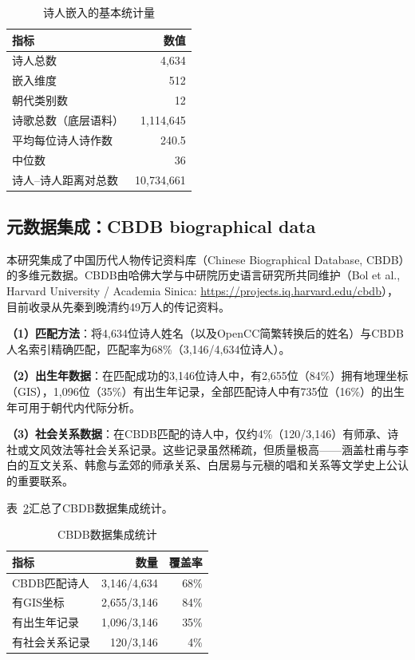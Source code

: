 \documentclass[12pt,a4paper]{article}
\numberwithin{equation}{section}
\begin{document}
\begin{table}[htbp]
  \centering
  \caption{诗人嵌入的基本统计量}
  \label{tab:embedding-stats}
  \begin{tabular}{lr}
    \toprule
    指标 & 数值 \\
    \midrule
    诗人总数               & 4,634      \\
    嵌入维度               & 512        \\
    朝代类别数             & 12         \\
    诗歌总数（底层语料）   & 1,114,645  \\
    平均每位诗人诗作数     & 240.5      \\
    中位数                 & 36         \\
    诗人--诗人距离对总数   & 10,734,661 \\
    \bottomrule
  \end{tabular}
\end{table}

\subsection{元数据集成：CBDB biographical data}

本研究集成了中国历代人物传记资料库（Chinese Biographical Database, CBDB）的多维元数据。CBDB由哈佛大学与中研院历史语言研究所共同维护（Bol et al., Harvard University / Academia Sinica: \url{https://projects.iq.harvard.edu/cbdb}），目前收录从先秦到晚清约49万人的传记资料。

\textbf{（1）匹配方法}：将4,634位诗人姓名（以及OpenCC简繁转换后的姓名）与CBDB人名索引精确匹配，匹配率为68\%（3,146/4,634位诗人）。

\textbf{（2）出生年数据}：在匹配成功的3,146位诗人中，有2,655位（84\%）拥有地理坐标（GIS），1,096位（35\%）有出生年记录，全部匹配诗人中有735位（16\%）的出生年可用于朝代内代际分析。

\textbf{（3）社会关系数据}：在CBDB匹配的诗人中，仅约4\%（120/3,146）有师承、诗社或文风效法等社会关系记录。这些记录虽然稀疏，但质量极高——涵盖杜甫与李白的互文关系、韩愈与孟郊的师承关系、白居易与元稹的唱和关系等文学史上公认的重要联系。

表~\ref{tab:cbdb-stats}汇总了CBDB数据集成统计。

\begin{table}[htbp]
  \centering
  \caption{CBDB数据集成统计}
  \label{tab:cbdb-stats}
  \begin{tabular}{lrr}
    \toprule
    指标               & 数量          & 覆盖率        \\
    \midrule
    CBDB匹配诗人       & 3,146/4,634   & 68\%          \\
    有GIS坐标          & 2,655/3,146   & 84\%          \\
    有出生年记录       & 1,096/3,146   & 35\%          \\
    有社会关系记录     &   120/3,146   &  4\%          \\
    \bottomrule
  \end{tabular}
\end{table}
\end{document}
